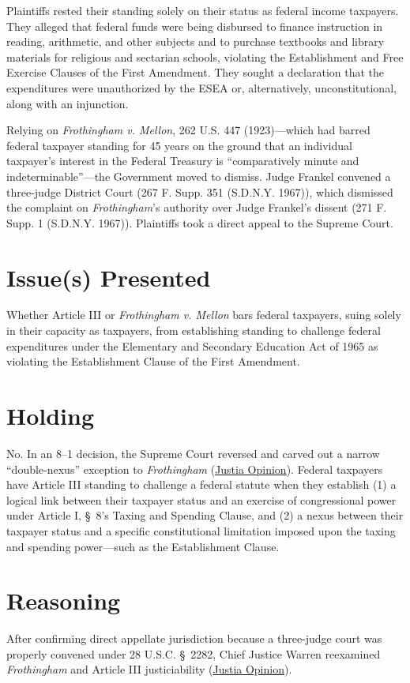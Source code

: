 \documentclass[12pt]{article}
\begin{document}
Plaintiffs rested their standing solely on their status as federal income taxpayers. They alleged that federal funds were being disbursed to finance instruction in reading, arithmetic, and other subjects and to purchase textbooks and library materials for religious and sectarian schools, violating the Establishment and Free Exercise Clauses of the First Amendment. They sought a declaration that the expenditures were unauthorized by the ESEA or, alternatively, unconstitutional, along with an injunction.

Relying on \textit{Frothingham v. Mellon}, 262 U.S. 447 (1923)---which had barred federal taxpayer standing for 45 years on the ground that an individual taxpayer's interest in the Federal Treasury is ``comparatively minute and indeterminable''---the Government moved to dismiss. Judge Frankel convened a three-judge District Court (267 F. Supp. 351 (S.D.N.Y. 1967)), which dismissed the complaint on \textit{Frothingham}'s authority over Judge Frankel's dissent (271 F. Supp. 1 (S.D.N.Y. 1967)). Plaintiffs took a direct appeal to the Supreme Court.

\section{Issue(s) Presented}
Whether Article III or \textit{Frothingham v. Mellon} bars federal taxpayers, suing solely in their capacity as taxpayers, from establishing standing to challenge federal expenditures under the Elementary and Secondary Education Act of 1965 as violating the Establishment Clause of the First Amendment.

\section{Holding}
No. In an 8--1 decision, the Supreme Court reversed and carved out a narrow ``double-nexus'' exception to \textit{Frothingham} (\href{https://supreme.justia.com/cases/federal/us/392/83/}{Justia Opinion}). Federal taxpayers have Article III standing to challenge a federal statute when they establish (1) a logical link between their taxpayer status and an exercise of congressional power under Article I, \S\ 8's Taxing and Spending Clause, and (2) a nexus between their taxpayer status and a specific constitutional limitation imposed upon the taxing and spending power---such as the Establishment Clause.

\section{Reasoning}
After confirming direct appellate jurisdiction because a three-judge court was properly convened under 28 U.S.C. \S\ 2282, Chief Justice Warren reexamined \textit{Frothingham} and Article III justiciability (\href{https://supreme.justia.com/cases/federal/us/392/83/}{Justia Opinion}).
\end{document}
